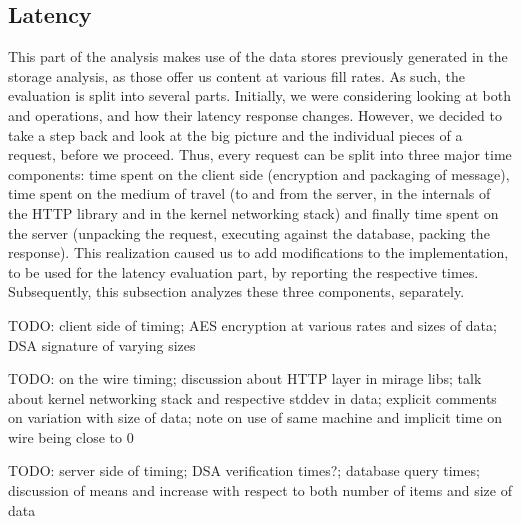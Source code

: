 \subsection{Latency}
This part of the analysis makes use of the data stores previously generated in the storage analysis, as those offer us content at various fill rates.
As such, the evaluation is split into several parts.
Initially, we were considering looking at both  and  operations, and how their latency response changes.
However, we decided to take a step back and look at the big picture and the individual pieces of a request, before we proceed.
Thus, every request can be split into three major time components: time spent on the client side (encryption and packaging of message), time spent on the medium of travel (to and from the server, in the internals of the HTTP library and in the kernel networking stack) and finally time spent on the server (unpacking the request, executing against the database, packing the response).
This realization caused us to add modifications to the implementation, to be used for the latency evaluation part, by reporting the respective times.
Subsequently, this subsection analyzes these three components, separately.

TODO: client side of timing; AES encryption at various rates and sizes of data; DSA signature of varying sizes

TODO: on the wire timing; discussion about HTTP layer in mirage libs; talk about kernel networking stack and respective stddev in data; explicit comments on variation with size of data; note on use of same machine and implicit time on wire being close to 0

TODO: server side of timing; DSA verification times?; database query times; discussion of means and increase with respect to both number of items and size of data
